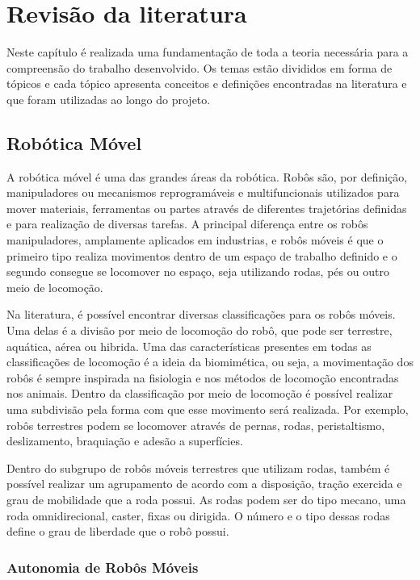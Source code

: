 \chapter{Revisão da literatura}

Neste capítulo é realizada uma fundamentação de toda a teoria necessária para a compreensão do trabalho desenvolvido. Os temas estão divididos em forma de tópicos e cada tópico apresenta conceitos e definições encontradas na literatura e que foram utilizadas ao longo do projeto. 

\section{Robótica Móvel}
A robótica móvel é uma das grandes áreas da robótica. Robôs são, por definição, manipuladores ou mecanismos reprogramáveis e multifuncionais utilizados para mover materiais, ferramentas ou partes através de diferentes trajetórias definidas e para realização de diversas tarefas. A principal diferença entre os robôs manipuladores, amplamente aplicados em industrias, e robôs móveis é que o primeiro tipo realiza movimentos dentro de um espaço de trabalho definido e o segundo consegue se locomover no espaço, seja utilizando rodas, pés ou outro meio de locomoção. \cite{nehmzow2012mobile}
\par
Na literatura, é possível encontrar diversas classificações para os robôs móveis. Uma delas é a divisão por meio de locomoção do robô, que pode ser terrestre, aquática, aérea ou hibrida. Uma das características presentes em todas as classificações de locomoção é a ideia da biomimética, ou seja, a movimentação dos robôs é sempre inspirada na fisiologia e nos métodos de locomoção encontradas nos animais. \cite{russo2020survey} Dentro da classificação por meio de locomoção é possível realizar uma subdivisão pela forma com que esse movimento será realizada. Por exemplo, robôs terrestres podem se locomover através de pernas, rodas, peristaltismo, deslizamento, braquiação e adesão a superfícies. \cite{russo2020survey}
\par
Dentro do subgrupo de robôs móveis terrestres que utilizam rodas, também é possível realizar um agrupamento de acordo com a disposição, tração exercida e grau de mobilidade que a roda possui. As rodas podem ser do tipo mecano, uma roda omnidirecional, caster, fixas ou dirigida. O número e o tipo dessas rodas define o grau de liberdade que o robô possui. \cite{gruber2016} 
\subsection{Autonomia de Robôs Móveis}

